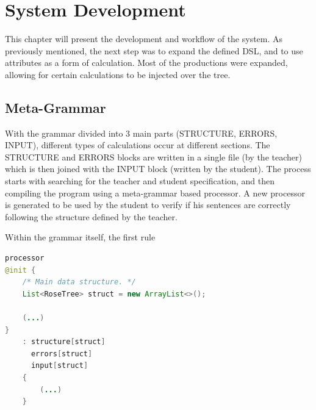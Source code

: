 \chapter{System Development} \label{system_development}

This chapter will present the development and workflow of the system. 
As previously mentioned, the next step was to expand the defined DSL, and to use attributes as a form of calculation. 
Most of the productions were expanded, allowing for certain calculations to be injected over the tree.


\section{Meta-Grammar}

With the grammar divided into 3 main parts (STRUCTURE, ERRORS, INPUT), different types of calculations occur at different sections. The STRUCTURE and ERRORS blocks are written in a single file (by the teacher) which is then joined 
with the INPUT block (written by the student). The process starts with searching for the teacher and student specification, and then compiling the program using a meta-grammar based processor. A new processor is generated to be 
used by the student to verify if his sentences are correctly following the structure defined by the teacher.

Within the grammar itself, the first rule
\newpage

%

\begin{center}
\begin{minipage}{11cm}
\begin{lstlisting}[language=java, basicstyle=\small, label={lst:processor}, caption=Processor rule from the meta-grammar]
processor
@init {
    /* Main data structure. */
    List<RoseTree> struct = new ArrayList<>();

    (...)
}
    : structure[struct]
      errors[struct]
      input[struct]
    {
        (...)
    }
\end{lstlisting}
\end{minipage}
\end{center}

